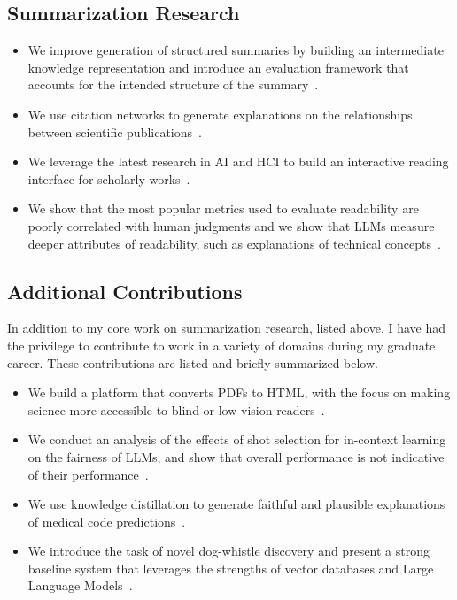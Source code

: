\subsection{Summarization Research}
\begin{itemize}
    \item We improve generation of structured summaries by building an intermediate knowledge representation and introduce an evaluation framework that accounts for the intended structure of the summary~\cite[][]{cachola-etal-2024-knowledge}.
    \item We use citation networks to generate explanations on the relationships between scientific publications~\cite{luu-etal-2021-explaining}.
    \item We leverage the latest research in AI and HCI to build an interactive reading interface for scholarly works~\cite{semantic-reader-project}.
    \item We show that the most popular metrics used to evaluate readability are poorly correlated with human judgments and we show that LLMs measure deeper attributes of readability, such as explanations of technical concepts~\cite[][]{cachola-etal-2025-evaluating}. 

\end{itemize}
\subsection{Additional Contributions}
In addition to my core work on summarization research, listed above, I have had the privilege to contribute to work in a variety of domains during my graduate career. These contributions are listed and briefly summarized below.
\begin{itemize}
    \item We build a platform that converts PDFs to HTML, with the focus on making science more accessible to blind or low-vision readers~\cite{wang-cachola-scially}. {\small {}}
    \item We conduct an analysis of the effects of shot selection for in-context learning on the fairness of LLMs, and show that overall performance is not indicative of their performance~\cite{aguirre-etal-2024-selecting}.
    \item We use knowledge distillation to generate faithful and plausible explanations of medical code predictions~\cite{wood-doughty-etal-2022-model}.
    \item We introduce the task of novel dog-whistle discovery and present a strong baseline system that leverages the strengths of vector databases and Large Language Models~\cite{sasse-etal-2025-making}.
\end{itemize}

